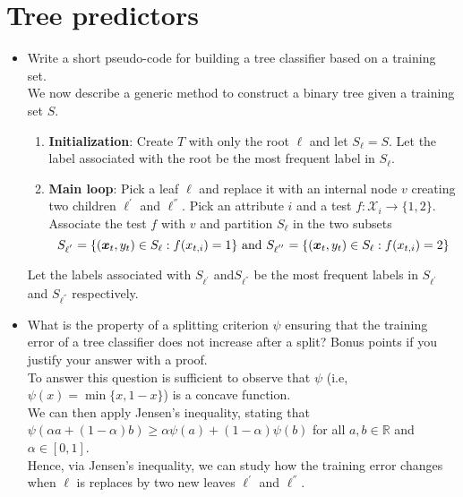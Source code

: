 \newpage
\section{Tree predictors}

\begin{itemize}
    
    \item Write a short pseudo-code for building a tree classifier based on a training set.\\
       
    We now describe a generic method to construct a binary tree given a training set $S$.\\
    \begin{enumerate}
    \item \textbf{Initialization}: Create $T$ with only the root $\ell$ and let $S_{\ell} = S$. Let the label associated with the root be the most frequent label in $S_{\ell}$. 
    \item \textbf{Main loop}: Pick a leaf $\ell$ and replace it with an internal node $v$ creating two children $\ell^{'}$ and $\ell^{''}$. Pick an attribute $i$ and a test $f : \mathcal{X}_i \rightarrow \{1,2\}$. Associate the test $f$ with $v$ and partition $S_{\ell}$ in the two subsets\\
        $$S_{\ell^{'}} = \{(\boldsymbol{x}_t, y_t) \in S_{\ell} : f(x_{t,i}) = 1\}\ \textmd{and}\ S_{\ell^{''}} = \{(\boldsymbol{x}_t, y_t)\in S_{\ell} : f(x_{t,i}) = 2\}$$ 
    \end{enumerate}
    Let the labels associated with $S_{\ell^{'}}$ and$S_{\ell^{''}}$ be the most frequent labels in $S_{\ell^{'}}$ and $S_{\ell^{''}}$ respectively.\\ 

    \item What is the property of a splitting criterion $\psi$ ensuring that the training error of a tree classifier does not increase after a split? Bonus points if you justify your answer with a proof.\\

        To answer this question is sufficient to observe that $\psi$ (i.e, $\psi(x) = \min{\{x, 1 - x\}}$) is a concave function.\\
    We can then apply Jensen’s inequality, stating that $\psi(\alpha a + (1-\alpha)b) \geq \alpha\psi(a) + (1 - \alpha)\psi(b)$ for all $a,b \in \mathbb{R}$ and $\alpha \in [0,1]$.\\

    Hence, via Jensen's inequality, we can study how the training error changes when $\ell$ is replaces by two new leaves $\ell^{'}$ and $\ell^{''}$.\\
    

\end{itemize}
